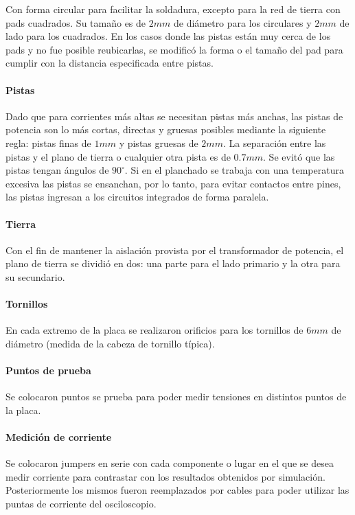 Con forma circular para facilitar la soldadura, excepto para la red de tierra con pads cuadrados.
Su tamaño es de $2mm$ de diámetro para los circulares y $2mm$ de lado para los cuadrados.
En los casos donde las pistas están muy cerca de los pads y no fue posible reubicarlas,
se modificó la forma o el tamaño del pad para cumplir con la distancia especificada entre pistas.  

\paragraph{Pistas}

Dado que para corrientes más altas se necesitan pistas más anchas, las pistas de potencia son lo más cortas, directas y gruesas posibles mediante la siguiente regla:
pistas finas de $1mm$ y pistas gruesas de $2mm$. 
La separación entre las pistas y el plano de tierra o cualquier otra pista es de $0.7mm$. 
Se evitó que las pistas tengan ángulos de $90^{\circ}$. 
Si en el planchado se trabaja con una temperatura excesiva las pistas se ensanchan, por lo tanto,
para evitar contactos entre pines, las pistas ingresan a los circuitos integrados de forma paralela. 

\paragraph{Tierra} 

Con el fin de mantener la aislación provista por el transformador de potencia, 
el plano de tierra se dividió en dos: una parte para el lado primario y la otra para su secundario.

\paragraph{Tornillos}

En cada extremo de la placa se realizaron orificios para los tornillos de $6mm$ de diámetro (medida de la cabeza de tornillo típica). 

\paragraph{Puntos de prueba}

Se colocaron puntos se prueba para poder medir tensiones en distintos puntos de la placa.

\paragraph{Medición de corriente} 

Se colocaron jumpers en serie con cada componente o lugar
en el que se desea medir corriente para contrastar con los resultados obtenidos por simulación.
Posteriormente los mismos fueron reemplazados por cables
para poder utilizar las puntas de corriente del osciloscopio.
